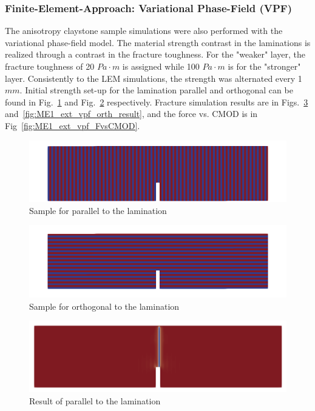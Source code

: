 \subsubsection*{Finite-Element-Approach: Variational Phase-Field (VPF)}

The anisotropy claystone sample simulations were also performed with the variational phase-field model.
The material strength contrast in the laminations is realized through a contrast in the fracture toughness. 
For the "weaker" layer, the fracture toughness of 20 $Pa \cdot m$ is assigned while 100 $Pa \cdot m$ is for the "stronger" layer.
Consistently to the LEM simulations, the strength was alternated every 1 $mm$. 
Initial strength set-up for the lamination parallel and orthogonal can be found in Fig.~\ref{fig:ME1_ext_vpf_para_init} and Fig.~\ref{fig:ME1_ext_vpf_orth_init} respectively.
Fracture simulation results are in Figs.~\ref{fig:ME1_ext_vpf_para_result} and~\ref{fig:ME1_ext_vpf_orth_result}, and the force vs. CMOD is in Fig~\ref{fig:ME1_ext_vpf_FvsCMOD}.

\begin{figure}[!ht]
\centering
\includegraphics[width=1\textwidth]{figures/ME1_ext_2D_parallel_init.png}
\caption{Sample for parallel to the lamination}
\label{fig:ME1_ext_vpf_para_init}
\end{figure}

\begin{figure}[!ht]
\centering
\includegraphics[width=1\textwidth]{figures/ME1_ext_2D_orthogonal_init.png}
\caption{Sample for orthogonal to the lamination}
\label{fig:ME1_ext_vpf_orth_init}
\end{figure}

\begin{figure}[!ht]
\centering
\includegraphics[width=1\textwidth]{figures/ME1_ext_2D_para_result.png}
\caption{Result of parallel to the lamination}
\label{fig:ME1_ext_vpf_para_result}
\end{figure}

